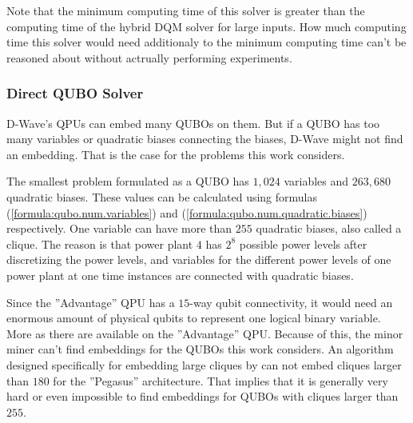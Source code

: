 Note that the minimum computing time of this solver is greater than the computing time of the hybrid DQM solver for large inputs.
How much computing time this solver would need additionaly to the minimum computing time can't be reasoned about without actrually performing experiments.

\subsubsection{Direct QUBO Solver}

D-Wave's QPUs can embed many QUBOs on them.
But if a QUBO has too many variables or quadratic biases connecting the biases, D-Wave might not find an embedding.
That is the case for the problems this work considers.

The smallest problem formulated as a QUBO has $1, 024$ variables and $263, 680$ quadratic biases.
These values can be calculated using formulas (\ref{formula:qubo.num.variables}) and (\ref{formula:qubo.num.quadratic.biases}) respectively.
One variable can have more than $255$ quadratic biases, also called a clique.
The reason is that power plant $4$ has $2^8$ possible power levels after discretizing the power levels, and variables for the different power levels of one power plant at one time instances are connected with quadratic biases.

Since the ''Advantage'' QPU has a $15$-way qubit connectivity, it would need an enormous amount of physical qubits to represent one logical binary variable.
More as there are available on the ''Advantage'' QPU.
\cite{D-Wave2020, Zbinden2020}
Because of this, the minor miner can't find embeddings for the QUBOs this work considers.
An algorithm designed specifically for embedding large cliques by \citeauthor{Zbinden2020} can not embed cliques larger than $180$ for the ''Pegasus'' architecture.
\cite{Zbinden2020}
That implies that it is generally very hard or even impossible to find embeddings for QUBOs with cliques larger than $255$.
